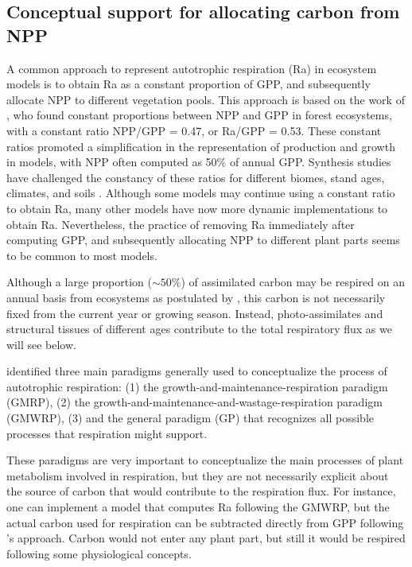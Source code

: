 \documentclass[bg, manuscript]{copernicus}
\begin{document}
\subsection{Conceptual support for allocating carbon from NPP}
A common approach to represent autotrophic respiration (Ra) in ecosystem models is to obtain Ra as a constant proportion of GPP, and subsequently allocate NPP to different vegetation pools. This approach is based on the work of \citet{Waring1998}, who found constant proportions between NPP and GPP in forest ecosystems, with a constant ratio NPP/GPP = 0.47, or Ra/GPP = 0.53. These constant ratios  promoted  a simplification in the representation of production and growth in models, with NPP often computed as 50\% of annual GPP. Synthesis studies have challenged the constancy of these ratios for different biomes, stand ages, climates, and soils \citep{DeLucia2007, Collalti2019}. 
Although some models may continue using a constant ratio to obtain Ra, many other models have now more dynamic implementations to obtain Ra. Nevertheless, the practice of removing Ra immediately after computing GPP, and subsequently allocating NPP to different plant parts seems to be common to most models. 


Although a large proportion ($\sim 50\%$) of assimilated carbon may be respired on an annual basis from ecosystems as postulated by \citet{Waring1998}, this carbon is not necessarily fixed from the current year or growing season. Instead, photo-assimilates and structural tissues of different ages contribute to the total respiratory flux as we will see below.

\citet{Amthor2000} identified three main paradigms generally used to conceptualize the process of autotrophic respiration: (1) the growth-and-maintenance-respiration paradigm (GMRP), (2) the growth-and-maintenance-and-wastage-respiration paradigm (GMWRP), (3) and the general paradigm (GP) that recognizes all possible processes that respiration might support. 

These paradigms are very important to conceptualize the main processes of plant metabolism involved in respiration, but they are not necessarily explicit about the source of carbon that would contribute to the respiration flux. For instance, one can implement a model that computes Ra following the GMWRP, but the actual carbon used for respiration can be subtracted directly from GPP following \citeauthor{Waring1998}'s \citeyearpar{Waring1998} approach. Carbon would not enter any plant part, but still it would be respired following some physiological concepts. 
\end{document}
